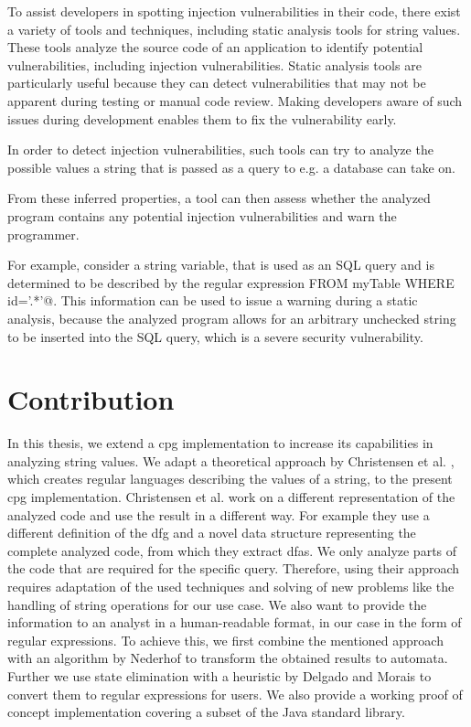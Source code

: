To assist developers in spotting injection vulnerabilities in their code, there exist a variety of tools and techniques, including static analysis tools for string values. These tools analyze the source code of an application to identify potential vulnerabilities, including injection vulnerabilities. Static analysis tools are particularly useful because they can detect vulnerabilities that may not be apparent during testing or manual code review. Making developers aware of such issues during development enables them to fix the vulnerability early.

In order to detect injection vulnerabilities, such tools can try to analyze the possible values a string that is passed as a query to e.g. a database can take on.

From these inferred properties, a tool can then assess whether the analyzed program contains any potential injection vulnerabilities and warn the programmer.

For example, consider a string variable, that is used as an SQL query and is determined to be described by the regular expression \Verb@DELETE \* FROM myTable WHERE id='.*'@.
This information can be used to issue a warning during a static analysis, because the analyzed program allows for an arbitrary unchecked string to be inserted into the SQL query, which is a severe security vulnerability.

\section{Contribution}

In this thesis, we extend a \acf{cpg} implementation \cite{cpg} to increase its capabilities in analyzing string values. We adapt a theoretical approach by Christensen et al. \cite{brics}, which creates regular languages describing the values of a string, to the present \ac{cpg} implementation. Christensen et al. work on a different representation of the analyzed code and use the result in a different way. For example they use a different definition of the \ac{dfg} and a novel data structure representing the complete analyzed code, from which they extract \acp{dfa}. We only analyze parts of the code that are required for the specific query. Therefore, using their approach requires adaptation of the used techniques and solving of new problems like the handling of string operations for our use case. We also want to provide the information to an analyst in a human-readable format, in our case in the form of regular expressions.
To achieve this, we first combine the mentioned approach with an algorithm by Nederhof \cite{nederhof} to transform the obtained results to automata. Further we use state elimination with a heuristic by Delgado and Morais \cite{delgado} to convert them to regular expressions for users. We also provide a working proof of concept implementation covering a subset of the Java standard library.

